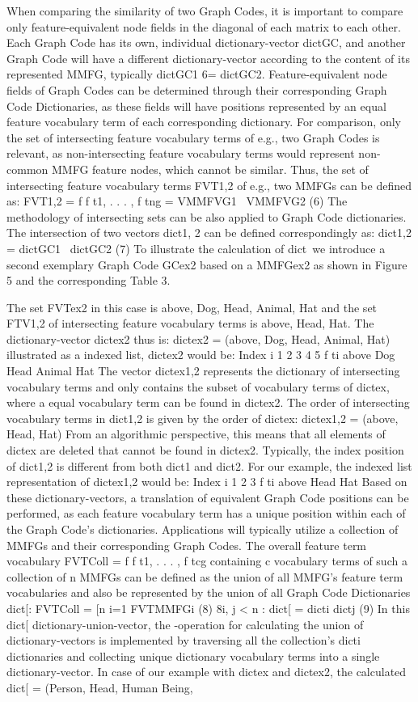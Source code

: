 When comparing the similarity of two Graph Codes, it is important to compare
only feature-equivalent node fields in the diagonal of each matrix to each other. Each
Graph Code has its own, individual dictionary-vector dictGC, and another Graph Code
will have a different dictionary-vector according to the content of its represented MMFG,
typically dictGC1 6= dictGC2. Feature-equivalent node fields of Graph Codes can be determined
through their corresponding Graph Code Dictionaries, as these fields will have
positions represented by an equal feature vocabulary term of each corresponding dictionary.
For comparison, only the set of intersecting feature vocabulary terms of e.g., two
Graph Codes is relevant, as non-intersecting feature vocabulary terms would represent
non-common MMFG feature nodes, which cannot be similar. Thus, the set of intersecting
feature vocabulary terms FVT1,2 of e.g., two MMFGs can be defined as:
FVT1,2 = f f t1, . . . , f tng = VMMFVG1 \ VMMFVG2 (6)
The methodology of intersecting sets can be also applied to Graph Code dictionaries.
The intersection of two vectors dict1, 2 can be defined correspondingly as:
dict1,2 = dictGC1 \ dictGC2 (7)
To illustrate the calculation of dict\, we introduce a second exemplary Graph Code
GCex2 based on a MMFGex2 as shown in Figure 5 and the corresponding Table 3.

The set FVTex2 in this case is above, Dog, Head, Animal, Hat and the set FTV1,2 of
intersecting feature vocabulary terms is above, Head, Hat. The dictionary-vector dictex2
thus is:
dictex2 = (above, Dog, Head, Animal, Hat)
illustrated as a indexed list, dictex2 would be:
Index i 1 2 3 4 5
f ti above Dog Head Animal Hat
The vector dictex1,2 represents the dictionary of intersecting vocabulary terms and
only contains the subset of vocabulary terms of dictex, where a equal vocabulary term can
be found in dictex2. The order of intersecting vocabulary terms in dict1,2 is given by the
order of dictex:
dictex1,2 = (above, Head, Hat)
From an algorithmic perspective, this means that all elements of dictex are deleted that
cannot be found in dictex2. Typically, the index position of dict1,2 is different from both
dict1 and dict2. For our example, the indexed list representation of dictex1,2 would be:
Index i 1 2 3
f ti above Head Hat
Based on these dictionary-vectors, a translation of equivalent Graph Code positions
can be performed, as each feature vocabulary term has a unique position within each of
the Graph Code’s dictionaries.
Applications will typically utilize a collection of MMFGs and their corresponding
Graph Codes. The overall feature term vocabulary FVTColl = f f t1, . . . , f tcg containing
c vocabulary terms of such a collection of n MMFGs can be defined as the union of all
MMFG’s feature term vocabularies and also be represented by the union of all Graph Code
Dictionaries dict[:
FVTColl =
[n
i=1
FVTMMFGi (8)
8i, j < n : dict[ = dicti  dictj (9)
In this dict[ dictionary-union-vector, the -operation for calculating the union of
dictionary-vectors is implemented by traversing all the collection’s dicti dictionaries and
collecting unique dictionary vocabulary terms into a single dictionary-vector. In case of
our example with dictex and dictex2, the calculated dict[ = (Person, Head, Human Being,



